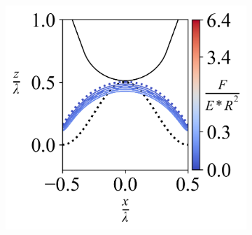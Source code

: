 \begin{figure}[H]
\begin{subfigure}{0.32\textwidth}
    \end{subfigure}  
    \hfill  
    \begin{subfigure}{0.32\textwidth}
        \centering
        \caption{\label{fig: All-Wave-LineContour-7}}
        \includegraphics[width=1\linewidth]{Figures/Wave-LineContour-7.png}
    \end{subfigure}  


    
    \hfill
    \vspace{-0.3in}
    


\end{figure}
